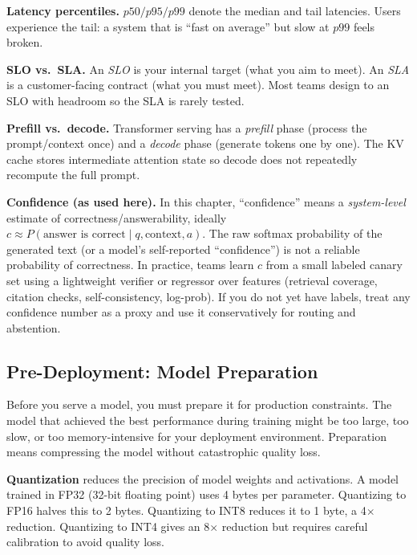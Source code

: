 \begin{notationbox}
\textbf{Latency percentiles.} $p50/p95/p99$ denote the median and tail latencies. Users experience the tail: a system that is ``fast on average'' but slow at $p99$ feels broken.

\textbf{SLO vs.\ SLA.} An \emph{SLO} is your internal target (what you aim to meet). An \emph{SLA} is a customer-facing contract (what you must meet). Most teams design to an SLO with headroom so the SLA is rarely tested.

\textbf{Prefill vs.\ decode.} Transformer serving has a \emph{prefill} phase (process the prompt/context once) and a \emph{decode} phase (generate tokens one by one). The KV cache stores intermediate attention state so decode does not repeatedly recompute the full prompt.

\textbf{Confidence (as used here).} In this chapter, ``confidence'' means a \emph{system-level} estimate of correctness/answerability, ideally $c \approx P(\text{answer is correct} \mid q, \text{context}, a)$. The raw softmax probability of the generated text (or a model's self-reported ``confidence'') is not a reliable probability of correctness. In practice, teams learn $c$ from a small labeled canary set using a lightweight verifier or regressor over features (retrieval coverage, citation checks, self-consistency, log-prob). If you do not yet have labels, treat any confidence number as a proxy and use it conservatively for routing and abstention.
\end{notationbox}

\vspace{0.5em}

\subsection{Pre-Deployment: Model Preparation}

Before you serve a model, you must prepare it for production constraints. The model that achieved the best performance during training might be too large, too slow, or too memory-intensive for your deployment environment. Preparation means compressing the model without catastrophic quality loss.

\textbf{Quantization} reduces the precision of model weights and activations. A model trained in FP32 (32-bit floating point) uses 4 bytes per parameter. Quantizing to FP16 halves this to 2 bytes. Quantizing to INT8 reduces it to 1 byte, a 4$\times$ reduction. Quantizing to INT4 gives an 8$\times$ reduction but requires careful calibration to avoid quality loss.

